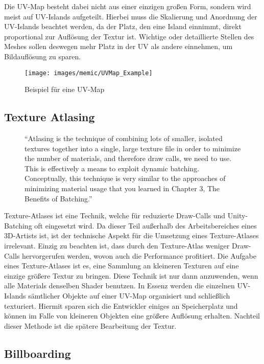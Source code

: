 Die UV-Map besteht dabei nicht aus einer einzigen großen Form, sondern wird meist auf UV-Islands aufgeteilt. Hierbei muss die Skalierung und Anordnung der UV-Islands beachtet werden, da der Platz, den eine Island einnimmt, direkt proportional zur Auflösung der Textur ist. Wichtige oder detaillierte Stellen des Meshes sollen deswegen mehr Platz in der UV als andere einnehmen, um Bildauflösung zu sparen.\cite[S.18]{_3d_modeling_pipline}

\begin{figure}[H]
	\centering
	\texttt{[image: images/memic/UVMap\_Example]}
	\caption{Beispiel für eine UV-Map}
\end{figure}

\subsection{Texture Atlasing}

\begin{figure}[H]
	\centering
"`Atlasing is the technique of combining lots of smaller, isolated textures together into a single, large texture file in order to minimize the number of materials, and therefore draw calls, we need to use. This is effectively a means to exploit dynamic batching. Conceptually, this technique is very similar to the approaches of minimizing material usage that you learned in Chapter 3, The Benefits of Batching."'\cite[S.145]{_unity_game_optimization}
\end{figure}


Texture-Atlases ist eine Technik, welche für reduzierte Draw-Calls und Unity-Batching oft eingesetzt wird. Da dieser Teil außerhalb des Arbeitsbereiches eines 3D-Artists ist, ist der technische Aspekt für die Umsetzung eines Texture-Atlases irrelevant. Einzig zu beachten ist, dass durch den Texture-Atlas weniger Draw-Calls hervorgerufen werden, wovon auch die Performance profitiert.
Die Aufgabe eines Texture-Atlases ist es, eine Sammlung an kleineren Texturen auf eine einzige größere Textur zu bringen. Diese Technik ist nur dann anzuwenden, wenn alle Materials denselben Shader benutzen. In Essenz werden die einzelnen UV-Islands sämtlicher Objekte auf einer UV-Map organisiert und schließlich texturiert. Hiermit sparen sich die Entwickler einiges an Speicherplatz und können im Falle von kleineren Objekten eine größere Auflösung erhalten. Nachteil dieser Methode ist die spätere Bearbeitung der Textur.\cite[S.146]{_unity_game_optimization}

\subsection{Billboarding}

